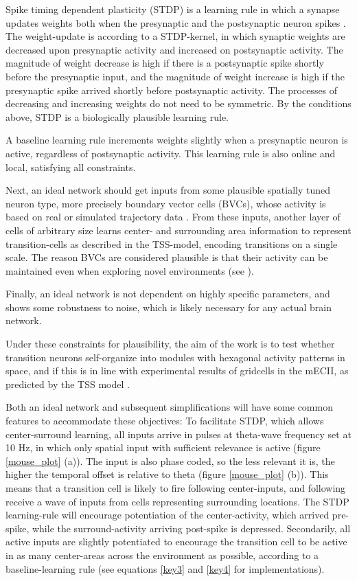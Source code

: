 \documentclass{article}
\begin{document}
    Spike timing dependent plasticity (STDP) is a learning rule in which a synapse updates weights both when the presynaptic and the postsynaptic neuron spikes \parencite{Song2000}. The weight-update is according to a STDP-kernel, in which synaptic weights are decreased upon presynaptic activity and increased on postsynaptic activity. The magnitude of weight decrease is high if there is a postsynaptic spike shortly before the presynaptic input, and the magnitude of weight increase is high if the presynaptic spike arrived shortly before postsynaptic activity. The processes of decreasing and increasing weights do not need to be symmetric. By the conditions above, STDP is a biologically plausible learning rule.

    A baseline learning rule increments weights slightly when a presynaptic neuron is active, regardless of postsynaptic activity. This learning rule is also online and local, satisfying all constraints.
    
    Next, an ideal network should get inputs from some plausible spatially tuned neuron type, more precisely boundary vector cells (BVCs), whose activity is based on real or simulated trajectory data \parencite{Lever2009}. From these inputs, another layer of cells of arbitrary size learns center- and surrounding area information to represent transition-cells as described in the TSS-model, encoding transitions on a single scale. The reason BVCs are considered plausible is that their activity can be maintained even when exploring novel environments (see \cite{Raudies2012}).
    
    Finally, an ideal network is not dependent on highly specific parameters, and shows some robustness to noise, which is likely necessary for any actual brain network.

    Under these constraints for plausibility, the aim of the work is to test whether transition neurons self-organize into modules with hexagonal activity patterns in space, and if this is in line with experimental results of gridcells in the mECII, as predicted by the TSS model \parencite{Waniek2018}.

    Both an ideal network and subsequent simplifications will have some common features to accommodate these objectives: To facilitate STDP, which allows center-surround learning, all inputs arrive in pulses at theta-wave frequency set at 10 Hz, in which only spatial input with sufficient relevance is active (figure \ref{mouse_plot} (a)). The input is also phase coded, so the less relevant it is, the higher the temporal offset is relative to theta (figure \ref{mouse_plot} (b)). This means that a transition cell is likely to fire following center-inputs, and following receive a wave of inputs from cells representing surrounding locations. The STDP learning-rule will encourage potentiation of the center-activity, which arrived pre-spike, while the surround-activity arriving post-spike is depressed. Secondarily, all active inputs are slightly potentiated to encourage the transition cell to be active in as many center-areas across the environment as possible, according to a baseline-learning rule (see equations \ref{key3} and \ref{key4} for implementations).
\end{document}
